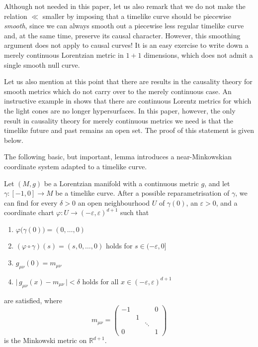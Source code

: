 \documentclass[reqno]{article}
\newcommand{\R}{\mathbb{R}}
\newcommand{\ed}{(-\varepsilon, \varepsilon)^{d+1}}
\begin{document}
Although not needed in this paper, let us also remark that we do not make the relation $\ll$ smaller by imposing that a timelike curve should be piecewise \emph{smooth}, since we can always smooth out a piecewise less regular timelike curve and, at the same time, preserve its causal character. However, this smoothing argument does not apply to causal curves! It is an easy exercise to write down a merely continuous Lorentzian metric in $1+1$ dimensions, which does not admit a single smooth null curve. 

Let us also mention at this point that there are results in the causality theory for smooth metrics which do not carry over to the merely continuous case. An instructive example in \cite{ChrusGra12} shows that there are continuous Lorentz metrics for which the light cones are no longer hypersurfaces. In this paper, however, the only result in causality theory for merely continuous metrics we need is that the timelike future and past remains an open set. The proof of this statement is given below.

The following basic, but important, lemma introduces a near-Minkowskian coordinate system adapted to a timelike curve.

\begin{lemma}
\label{NormalForm}
Let $(M,g)$ be a Lorentzian manifold with a continuous metric $g$, and let $\gamma : [-1,0] \to M$ be a timelike curve. After a possible reparametrisation of $\gamma$, we can find for every $\delta >0$ an open neighbourhood $U$ of $\gamma(0)$, an $\varepsilon >0$, and a coordinate chart $\varphi : U \to \ed$ such that
\begin{enumerate}
\item $\varphi\big(\gamma(0)\big) = (0,\ldots, 0)$
\item $(\varphi \circ \gamma) (s) = (s,0, \ldots, 0) $ holds for $s \in (-\varepsilon, 0]$
\item $g_{\mu \nu}(0) = m_{\mu \nu}$
\item $\big| \,g_{\mu \nu}(x) - m_{\mu \nu} \,\big| < \delta $ holds for all $x \in (-\varepsilon , \varepsilon)^{d+1}$ 
\end{enumerate}
are satisfied, where
\begin{equation*}
m_{\mu \nu} = 
\begin{pmatrix}
-1 &    &            & 0      \\
     & 1 &            &         \\
     &    & \ddots &         \\
 0  &    &            & 1
\end{pmatrix}
\end{equation*}
is the Minkowski metric  on $\R^{d+1}$.
\end{lemma}
\end{document}
